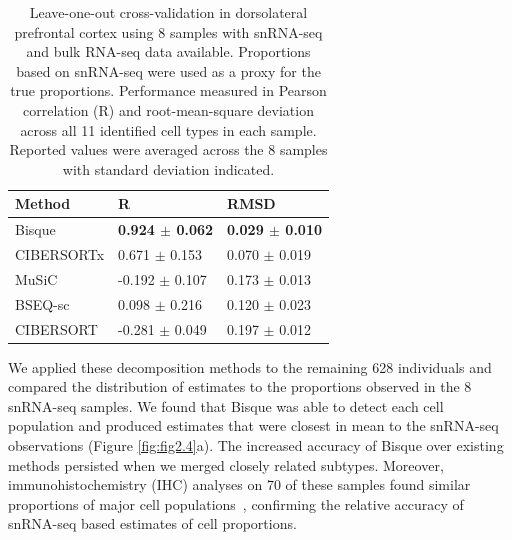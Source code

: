 \begin{table}
    \scriptsize
    \centering
    \begin{tabular}{|p{3cm}|p{3cm}|p{3cm}|}
    \hline
    \rowcolor{mygray}
    \textbf{Method} & \textbf{R} & \textbf{RMSD} \\ \hline
        Bisque & \textbf{0.924 $\pm$ 0.062} & \textbf{0.029 $\pm$ 0.010} \\ \hline
        CIBERSORTx & 0.671 $\pm$ 0.153 & 0.070 $\pm$ 0.019 \\ \hline
        MuSiC & -0.192 $\pm$ 0.107 & 0.173 $\pm$ 0.013 \\ \hline
        BSEQ-sc & 0.098 $\pm$ 0.216 & 0.120 $\pm$ 0.023 \\ \hline
        CIBERSORT & -0.281 $\pm$ 0.049 & 0.197 $\pm$ 0.012 \\ \hline
    \end{tabular} 
    \captionsetup{justification=raggedright,singlelinecheck=false}
    \caption{
        Leave-one-out cross-validation in dorsolateral prefrontal cortex using 8 samples with snRNA-seq and bulk RNA-seq data available. Proportions based on snRNA-seq were used as a proxy for the true proportions. Performance measured in Pearson correlation (R) and root-mean-square deviation across all 11 identified cell types in each sample. Reported values were averaged across the 8 samples with standard deviation indicated.
        }
    \label{table:table2.3}
\end{table}
We applied these decomposition methods to the remaining 628 individuals and compared the distribution of estimates to the proportions observed in the 8 snRNA-seq samples. We found that Bisque was able to detect each cell population and produced estimates that were closest in mean to the snRNA-seq observations (Figure \ref{fig:fig2.4}a). The increased accuracy of Bisque over existing methods persisted when we merged closely related subtypes. Moreover, immunohistochemistry (IHC) analyses on 70 of these samples found similar proportions of major cell populations~\cite{Patrick_undated-vv}, confirming the relative accuracy of snRNA-seq based estimates of cell proportions. 

